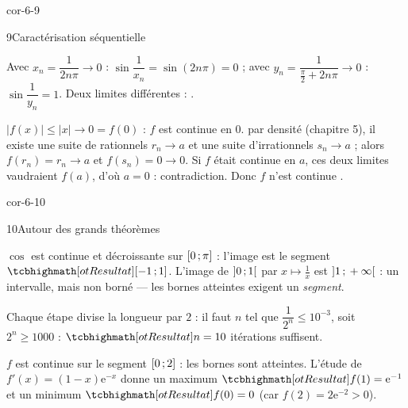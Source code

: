 \begin{blocLivre}{cor-6-9}
\begin{corrige}{9}{Caractérisation séquentielle}
\begin{questions}
  \item Avec $x_n=\dfrac{1}{2n\pi}\to0$ : $\sin\dfrac{1}{x_n}=\sin(2n\pi)=0$ ;
    avec $y_n=\dfrac{1}{\frac{\pi}{2}+2n\pi}\to0$ :
    $\sin\dfrac{1}{y_n}=1$. Deux limites différentes :
    .
  \item {} $|f(x)|\leq|x|\to0=f(0)$ : $f$ est continue en $0$.
     par densité (chapitre 5), il existe une suite de
    rationnels $r_n\to a$ et une suite d'irrationnels $s_n\to a$ ; alors
    $f(r_n)=r_n\to a$ et $f(s_n)=0\to0$. Si $f$ était continue en $a$, ces
    deux limites vaudraient $f(a)$, d'où $a=0$ : contradiction. Donc $f$
    n'est continue .
\end{questions}
\end{corrige}
\end{blocLivre}

\begin{blocLivre}{cor-6-10}
\begin{corrige}{10}{Autour des grands théorèmes}
\begin{questions}
  \item $\cos$ est continue et décroissante sur $\mathopen{[}0\,{;}\,\pi\mathclose{]}$ :
    l'image est le segment $\res{\intFF{-1}{1}}$. L'image de $\mathopen{]}0\,{;}\,1\mathclose{[}$
    par $x\mapsto\frac1x$ est $\mathopen{]}1\,{;}\,+\infty\mathclose{[}$ : un intervalle, mais non
    borné — les bornes atteintes exigent un \emph{segment}.
  \item Chaque étape divise la longueur par $2$ : il faut $n$ tel que
    $\dfrac{1}{2^{n}}\leq10^{-3}$, soit $2^{n}\geq1000$ :
    $\res{n=10}$ itérations suffisent.
  \item $f$ est continue sur le segment $\mathopen{[}0\,{;}\,2\mathclose{]}$ : les bornes sont
    atteintes. L'étude de $f'(x)=(1-x)\mathrm{e}^{-x}$ donne un maximum
    $\res{f(1)=\mathrm{e}^{-1}}$ et un minimum $\res{f(0)=0}$
    (car $f(2)=2\mathrm{e}^{-2}>0$).
\end{questions}
\end{corrige}
\end{blocLivre}

